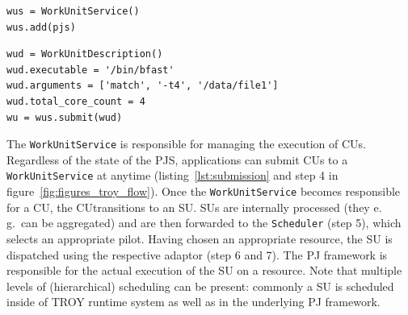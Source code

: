 \documentclass[conference,final]{IEEEtran}
\newcommand{\cu}{CU}
\begin{document}
\noindent\begin{minipage}{0.47 \textwidth}
\begin{lstlisting}[caption={\textbf{WorkUnitService Creation:} Instantiation of 
	a \texttt{WorkUnitService} using a reference to the 
	\texttt{PilotJobService}.}, 
	label={lst:wus_creation}]
wus = WorkUnitService()
wus.add(pjs)
\end{lstlisting}
\end{minipage}

\noindent\begin{minipage}{0.47 \textwidth}
\begin{lstlisting}[caption={\textbf{WorkUnit Submission:} Instantiation and 
	submission of a \texttt{WorkUnitDescription}.}, label={lst:submission}] 
wud = WorkUnitDescription()
wud.executable = '/bin/bfast'
wud.arguments = ['match', '-t4', '/data/file1']
wud.total_core_count = 4
wu = wus.submit(wud)
\end{lstlisting}
\end{minipage}


The \texttt{WorkUnitService} is responsible for managing the execution of \cu s.
Regardless of the state of the PJS, applications can submit \cu s to a
\texttt{WorkUnitService} at anytime (listing~\ref{lst:submission} and step 4 in
figure~\ref{fig:figures_troy_flow}). Once the \texttt{WorkUnitService} becomes
responsible for a \cu, the \cu  transitions to an SU. SUs are internally processed
(they e.\,g.\ can be aggregated) and are then forwarded to the
\texttt{Scheduler} (step 5), which selects an appropriate pilot. Having chosen
an appropriate resource, the SU is dispatched using the respective adaptor (step
6 and 7). The PJ framework is responsible for the actual execution of the SU on
a resource. Note that multiple levels of (hierarchical) scheduling can be
present: commonly a SU is scheduled inside of TROY runtime system as well as in
the underlying PJ framework.
\end{document}
